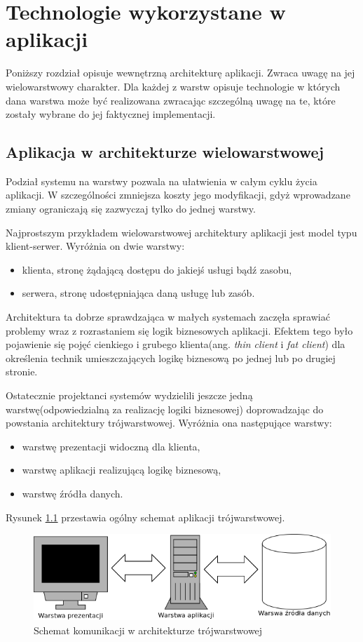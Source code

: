 \chapter{Technologie wykorzystane w aplikacji}
Poniższy rozdział opisuje wewnętrzną architekturę aplikacji. Zwraca uwagę na jej wielowarstwowy charakter. Dla każdej z warstw opisuje technologie w których dana warstwa może być realizowana zwracając szczególną uwagę na te, które zostały wybrane do jej faktycznej implementacji.

\section[Aplikacja w architekturze wielowarstwowej][Aplikacja w architekturze wielowarstwowej]{Aplikacja w architekturze wielowarstwowej}
Podział systemu na warstwy pozwala na ułatwienia w całym cyklu życia aplikacji. W szczególności zmniejsza koszty jego modyfikacji, gdyż wprowadzane zmiany ograniczają się zazwyczaj tylko do jednej warstwy. 

Najprostszym przykładem wielowarstwowej architektury aplikacji jest model typu klient-serwer. Wyróżnia on dwie warstwy:
\begin{itemize}
	\item klienta, stronę żądającą dostępu do jakiejś usługi bądź zasobu,
	\item serwera, stronę udostępniająca daną usługę lub zasób.
\end{itemize}
Architektura ta dobrze sprawdzająca w małych systemach zaczęła sprawiać problemy wraz z rozrastaniem się logik biznesowych aplikacji. Efektem tego było pojawienie się pojęć cienkiego i grubego klienta(ang. \textit{thin client} i \textit{fat client}) dla określenia technik umieszczających logikę biznesową po jednej lub po drugiej stronie.

Ostatecznie projektanci systemów wydzielili jeszcze jedną warstwę(odpowiedzialną za realizację logiki biznesowej) doprowadzając do powstania architektury trójwarstwowej. Wyróżnia ona następujące warstwy:
\begin{itemize}
	\item warstwę prezentacji widoczną dla klienta,
	\item warstwę aplikacji realizującą logikę biznesową,
	\item warstwę źródła danych.
\end{itemize}
Rysunek \ref{warstwy} przestawia ogólny schemat aplikacji trójwarstwowej.

\begin{figure}[tdh]
    \begin{center}
	\includegraphics[scale=.7 ]{img/warstwy.png}
	\caption{Schemat komunikacji w architekturze trójwarstwowej}
	\label{warstwy}
    \end{center}
\end{figure}


